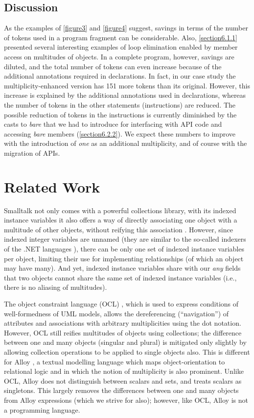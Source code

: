 {\subsection{Discussion}
\label{section6.4}

\noindent As the examples of \autoref{figure3} and \autoref{figure4} suggest, savings in terms
of the number of tokens used in a program fragment can be considerable.
Also, \autoref{section6.1.1} presented several interesting examples of loop
elimination enabled by member access on multitudes of objects. In a complete
program, however, savings are diluted, and the total number of tokens can
even increase because of the additional annotations required in
declarations. In fact, in our case study the multiplicity-enhanced version
has 151 more tokens than its original. However, this increase is explained
by the additional annotations used in declarations, whereas the number of
tokens in the other statements (instructions) are reduced. The possible
reduction of tokens in the instructions is currently diminished by the casts
to \emph{bare} that we had to introduce for interfacing with API code
and accessing \emph{bare} members (\autoref{section6.2.2}). We expect these
numbers to improve with the introduction of \emph{one} as an additional
multiplicity, and of course with the migration of APIs.

\section{Related Work}
\label{section7}

\noindent Smalltalk not only comes with a powerful collections library, with
its indexed instance variables it also offers a way of directly associating
one object with a multitude of other objects, without reifying this
association \cite{ref19}. However, since indexed integer variables are unnamed (they
are similar to the so-called indexers of the .NET languages \cite{ref23}), there can
be only one set of indexed instance variables per object, limiting their use
for implementing relationships (of which an object may have many). And yet,
indexed instance variables share with our \emph{any} fields that two objects
cannot share the same set of indexed instance variables (i.e., there is no
aliasing of multitudes).

The object constraint language (OCL) \cite{ref6, ref27}, which is used to express
conditions of well-formedness of UML models, allows the dereferencing
(``navigation'') of attributes and associations with arbitrary multiplicities
using the dot notation. However, OCL still reifies multitudes of objects
using collections; the difference between one and many objects (singular and
plural) is mitigated only slightly by allowing collection operations to be
applied to single objects also. This is different for Alloy \cite{ref21}, a textual
modelling language which maps object-orientation to relational logic and in
which the notion of multiplicity is also prominent. Unlike OCL, Alloy does
not distinguish between scalars and sets, and treats scalars as singletons.
This largely removes the differences between one and many objects from Alloy
expressions (which we strive for also); however, like OCL, Alloy is not a
programming language.

}
